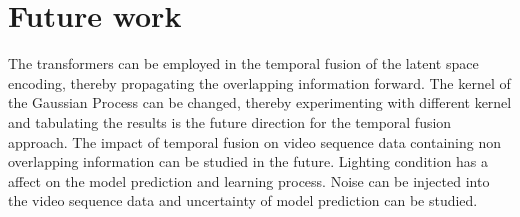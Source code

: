     \section{Future work}
    
	The transformers can be employed in the temporal fusion of the latent space encoding, thereby propagating the overlapping information forward. The kernel of the Gaussian Process can be changed, thereby experimenting with different kernel and tabulating the results is the future direction for the temporal fusion approach. The impact of temporal fusion on video sequence data containing non overlapping information can be studied in the future. Lighting condition has a affect on the model prediction and learning process. Noise can be injected into the video sequence data and uncertainty of model prediction can be studied.
    

